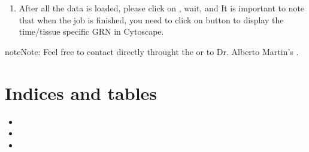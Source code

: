 \documentclass[letterpaper,10pt,english]{sphinxmanual}
\begin{document}
\begin{enumerate}
\def\theenumi{\arabic{enumi}}
\def\labelenumi{\theenumi .}
\makeatletter\def\p@enumii{\p@enumi \theenumi .}\makeatother
\setcounter{enumi}{3}
\item {} 

After all the data is loaded, please click on , wait, and
It is important to note that when the job is finished, you need to click on  button to display the time/tissue specific GRN in Cytoscape.

\end{enumerate}

\begin{sphinxadmonition}{note}{Note:}
Feel free to contact directly throught the 
or to Dr. Alberto Martin’s .
\end{sphinxadmonition}


\chapter{Indices and tables}
\label{\detokenize{index:indices-and-tables}}\begin{itemize}
\item {} 

\item {} 

\item {} 

\end{itemize}



\renewcommand{\indexname}{Index}
\printindex
\end{document}
